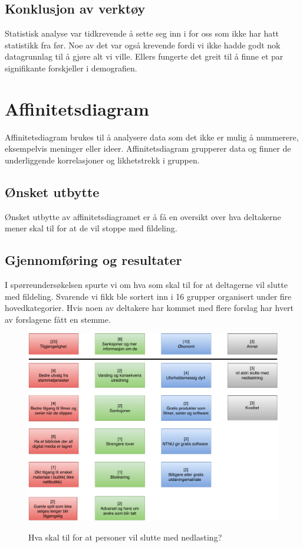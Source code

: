 \subsection{Konklusjon av verktøy}
Statistisk analyse var tidkrevende å sette seg inn i for oss som ikke har hatt statistikk fra før. Noe av det var også krevende fordi vi ikke hadde godt nok datagrunnlag til å gjøre alt vi ville. Ellers fungerte det greit til å finne et par signifikante forskjeller i demografien. 


\section{Affinitetsdiagram}
Affinitetsdiagram brukes til å analysere data som det ikke er mulig å nummerere, eksempelvis meninger eller ideer. Affinitetsdiagram grupperer data og finner de underliggende korrelasjoner og likhetstrekk i gruppen. 

\subsection{Ønsket utbytte}
Ønsket utbytte av affinitetsdiagramet er å få en oversikt over hva deltakerne mener skal til for at de vil stoppe med fildeling.
\subsection{Gjennomføring og resultater}
I spørreundersøkelsen spurte vi om hva som skal til for at deltagerne vil slutte med fildeling. Svarende vi fikk ble sortert inn i 16 grupper organisert under fire hovedkategorier. Hvis noen av deltakere har kommet med flere forslag har hvert av forslagene fått en stemme.  

\begin{figure}[H]
    \centering
    \includegraphics[scale=0.6]{case_1/bilder/stoppe_nedlastning.pdf}
    \label{fig:stoppe_nedlastning}
    \caption{Hva skal til for at personer vil slutte med nedlasting?}
\end{figure}

